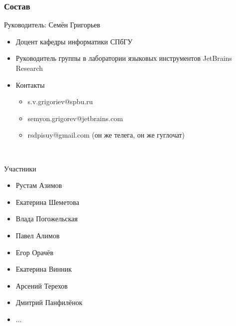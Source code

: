 \documentclass[xcolor=table,aspectratio=169]{beamer}
\begin{document}
\begin{frame}[fragile]

  \frametitle{Состав}
  \begin{minipage}[t]{0.55\textwidth}
Руководитель:  Семён Григорьев
\begin{itemize}
      \item Доцент кафедры информатики СПбГУ
      \item Руководитель группы в лаборатории языковых инструментов JetBrains Research
      \item Контакты
      \begin{itemize}
        \item s.v.grigoriev@spbu.ru
        \item semyon.grigorev@jetbrains.com
        \item rsdpisuy@gmail.com (он же телега, он же гуглочат)        
      \end{itemize}

\end{itemize}
\end{minipage}\pause
~\begin{minipage}[t]{0.35\textwidth}
  Участники
  \begin{itemize}
      \item Рустам Азимов
      \item Екатерина Шеметова
      \item Влада Погожельская
      \item Павел Алимов
      \item Егор Орачёв
      \item Екатерина Винник
      \item Арсений Терехов
      \item Дмитрий Панфилёнок
      \item $\ldots$
\end{itemize}

  \end{minipage}
\end{frame}
\end{document}
